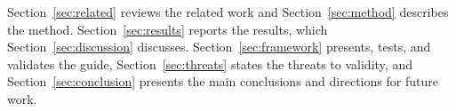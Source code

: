 Section~\ref{sec:related} reviews the related work and Section~\ref{sec:method} describes the method.
Section~\ref{sec:results} reports the results, which Section~\ref{sec:discussion} discusses.
Section~\ref{sec:framework} presents, tests, and validates the guide, Section~\ref{sec:threats} states the threats
to validity, and Section~\ref{sec:conclusion} presents the main conclusions and directions for future work.
